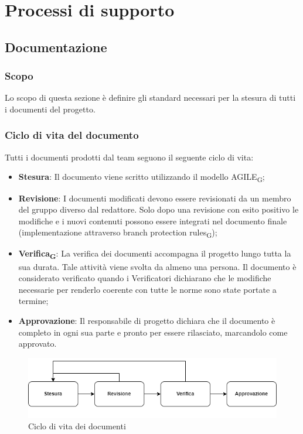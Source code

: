 \section{Processi di supporto}

\subsection{Documentazione}

\subsubsection{Scopo}
Lo scopo di questa sezione è definire gli standard necessari per la stesura di tutti i documenti del progetto.

\subsubsection{Ciclo di vita del documento}
Tutti i documenti prodotti dal team seguono il seguente ciclo di vita:
\begin{itemize}
    \item \textbf{Stesura}: Il documento viene scritto utilizzando il modello AGILE\textsubscript{G};
    \item \textbf{Revisione}: I documenti modificati devono essere revisionati da un membro del gruppo diverso dal redattore. Solo dopo una revisione con esito positivo le modifiche e i nuovi contenuti possono essere integrati nel documento finale (implementazione attraverso branch protection rules\textsubscript{G});
    \item \textbf{Verifica\textsubscript{G}}: La verifica dei documenti accompagna il progetto lungo tutta la sua durata. Tale attività viene svolta da almeno una persona. Il documento è considerato 
	verificato quando i Verificatori dichiarano che le modifiche necessarie per renderlo coerente con tutte le norme sono state portate a termine; 
    \item \textbf{Approvazione}: Il responsabile di progetto dichiara che il documento è completo in ogni sua parte e pronto per essere rilasciato, marcandolo come approvato.
\end{itemize}
\begin{figure}[H]
    \centering
    \includegraphics[scale=0.8]{img/ciclo_di_vita.png}
    \caption{Ciclo di vita dei documenti}
\end{figure}
\newpage
